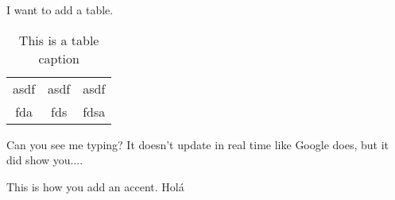 
I want to add a table.
\begin{table} 
    \begin{tabular}{ c c c }
        asdf & asdf & asdf \\ 
        fda & fds & fdsa \\ 
    \end{tabular} 
    \caption{This is a table caption} 
\end{table}

Can you see me typing? It doesn't update in real time like Google does, but it did show you....

This is how you add an accent. Holá

